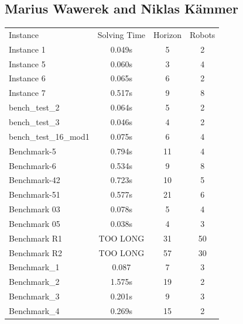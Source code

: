 \documentclass[runningheads]{llncs}
\begin{document}
\subsection{Marius Wawerek and Niklas Kämmer}
\begin{tabular}[h]{l|c|c|c}
Instance & Solving Time & Horizon & Robots \\
Instance 1 & 0.049s & 5 & 2 \\
Instance 5 & 0.060s  & 3 & 4 \\
Instance 6 & 0.065s & 6 & 2 \\
Instance 7 & 0.517s  & 9 & 8 \\
bench\_test\_2 & 0.064s & 5 & 2 \\
bench\_test\_3 & 0.046s & 4 & 2 \\
bench\_test\_16\_mod1 & 0.075s & 6 & 4 \\
Benchmark-5 & 0.794s & 11 & 4 \\
Benchmark-6 & 0.534s & 9 & 8 \\
Benchmark-42 & 0.723s & 10 & 5 \\ 
Benchmark-51 & 0.577s & 21 & 6 \\
Benchmark 03 & 0.078s & 5 & 4 \\
Benchmark 05 & 0.038s & 4 & 3 \\
Benchmark R1 & TOO LONG & 31 & 50 \\
Benchmark R2 & TOO LONG & 57 & 30 \\
Benchmark\_1 & 0.087 & 7 & 3 \\ 
Benchmark\_2 & 1.575s & 19 & 2 \\
Benchmark\_3 & 0.201s & 9 & 3 \\
Benchmark\_4 & 0.269s & 15 & 2 \\
\end{tabular}
\end{document}
